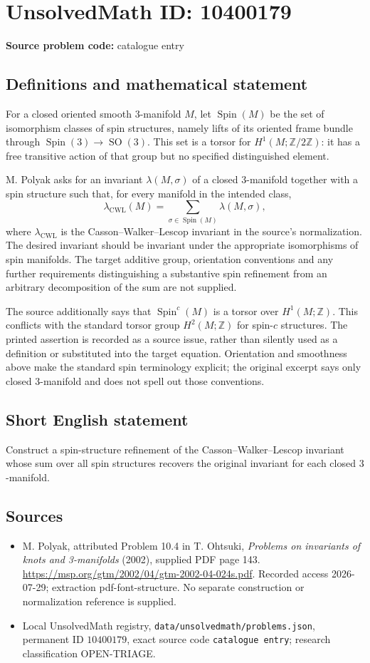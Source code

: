 \documentclass[11pt]{article}
\newcommand{\Z}{\mathbb{Z}}
\begin{document}
\section*{UnsolvedMath ID: 10400179}
\textbf{Source problem code:} catalogue entry
\subsection{Definitions and mathematical statement}
For a closed oriented smooth \(3\)-manifold \(M\), let \(\operatorname{Spin}(M)\) be the set of isomorphism classes of spin structures, namely lifts of its oriented frame bundle through \(\operatorname{Spin}(3)\to\operatorname{SO}(3)\). This set is a torsor for \(H^1(M;\Z/2\Z)\): it has a free transitive action of that group but no specified distinguished element.

M. Polyak asks for an invariant \(\lambda(M,\sigma)\) of a closed \(3\)-manifold together with a spin structure such that, for every manifold in the intended class,
\[
 \lambda_{\mathrm{CWL}}(M)
   =\sum_{\sigma\in\operatorname{Spin}(M)}\lambda(M,\sigma),
\]
where \(\lambda_{\mathrm{CWL}}\) is the Casson--Walker--Lescop invariant in the source's normalization. The desired invariant should be invariant under the appropriate isomorphisms of spin manifolds. The target additive group, orientation conventions and any further requirements distinguishing a substantive spin refinement from an arbitrary decomposition of the sum are not supplied.

The source additionally says that \(\operatorname{Spin}^{c}(M)\) is a torsor over \(H^1(M;\Z)\). This conflicts with the standard torsor group \(H^2(M;\Z)\) for spin-\(c\) structures. The printed assertion is recorded as a source issue, rather than silently used as a definition or substituted into the target equation. Orientation and smoothness above make the standard spin terminology explicit; the original excerpt says only closed \(3\)-manifold and does not spell out those conventions.
\subsection{Short English statement}
Construct a spin-structure refinement of the Casson--Walker--Lescop invariant whose sum over all spin structures recovers the original invariant for each closed \(3\)-manifold.
\subsection{Sources}
\begin{itemize}
\item M. Polyak, attributed Problem 10.4 in T. Ohtsuki, \emph{Problems on invariants of knots and 3-manifolds} (2002), supplied PDF page 143. \url{https://msp.org/gtm/2002/04/gtm-2002-04-024s.pdf}. Recorded access 2026-07-29; extraction pdf-font-structure. No separate construction or normalization reference is supplied.
\item Local UnsolvedMath registry, \texttt{data/unsolvedmath/problems.json}, permanent ID \(10400179\), exact source code \texttt{catalogue entry}; research classification OPEN-TRIAGE.
\end{itemize}
\end{document}
